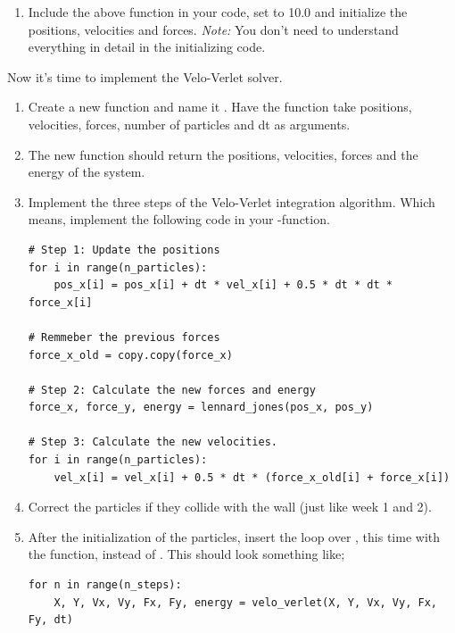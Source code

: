 \documentclass{article}
\begin{document}
\begin{enumerate}[resume]
    \item Include the above  function in your code, set  to 10.0 and initialize the positions, velocities and forces.
    {\em Note:} You don't need to understand everything in detail in the initializing code.
\end{enumerate}

Now it's time to implement the Velo-Verlet solver.

\begin{enumerate}[resume]

    \item Create a new function and name it .
        Have the function take positions, velocities, forces, number of particles and dt as arguments.

    \item The new function should return the positions, velocities, forces and the energy of the system.

    \item Implement the three steps of the Velo-Verlet integration algorithm.
        Which means, implement the following code in your -function.

\begin{lstlisting}
# Step 1: Update the positions
for i in range(n_particles):
    pos_x[i] = pos_x[i] + dt * vel_x[i] + 0.5 * dt * dt * force_x[i]

# Remmeber the previous forces
force_x_old = copy.copy(force_x)

# Step 2: Calculate the new forces and energy
force_x, force_y, energy = lennard_jones(pos_x, pos_y)

# Step 3: Calculate the new velocities.
for i in range(n_particles):
    vel_x[i] = vel_x[i] + 0.5 * dt * (force_x_old[i] + force_x[i])

\end{lstlisting}

    \item Correct the particles if they collide with the wall (just like week 1 and 2).

    \item After the initialization of the particles, insert the loop over , this time with the  function, instead of .
        This should look something like;

\begin{lstlisting}
for n in range(n_steps):
    X, Y, Vx, Vy, Fx, Fy, energy = velo_verlet(X, Y, Vx, Vy, Fx, Fy, dt)
\end{lstlisting}


\end{enumerate}
\end{document}
